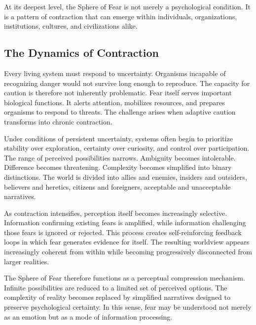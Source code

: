 \documentclass[12pt]{article}
\begin{document}
At its deepest level, the Sphere of Fear is not merely a psychological condition. It is a pattern of contraction that can emerge within individuals, organizations, institutions, cultures, and civilizations alike.


\subsection{The Dynamics of Contraction}

Every living system must respond to uncertainty. Organisms incapable of recognizing danger would not survive long enough to reproduce. The capacity for caution is therefore not inherently problematic. Fear itself serves important biological functions. It alerts attention, mobilizes resources, and prepares organisms to respond to threats. The challenge arises when adaptive caution transforms into chronic contraction.

Under conditions of persistent uncertainty, systems often begin to prioritize stability over exploration, certainty over curiosity, and control over participation. The range of perceived possibilities narrows. Ambiguity becomes intolerable. Difference becomes threatening. Complexity becomes simplified into binary distinctions. The world is divided into allies and enemies, insiders and outsiders, believers and heretics, citizens and foreigners, acceptable and unacceptable narratives.

As contraction intensifies, perception itself becomes increasingly selective. Information confirming existing fears is amplified, while information challenging those fears is ignored or rejected. This process creates self-reinforcing feedback loops in which fear generates evidence for itself. The resulting worldview appears increasingly coherent from within while becoming progressively disconnected from larger realities.

The Sphere of Fear therefore functions as a perceptual compression mechanism. Infinite possibilities are reduced to a limited set of perceived options. The complexity of reality becomes replaced by simplified narratives designed to preserve psychological certainty. In this sense, fear may be understood not merely as an emotion but as a mode of information processing.
\end{document}
